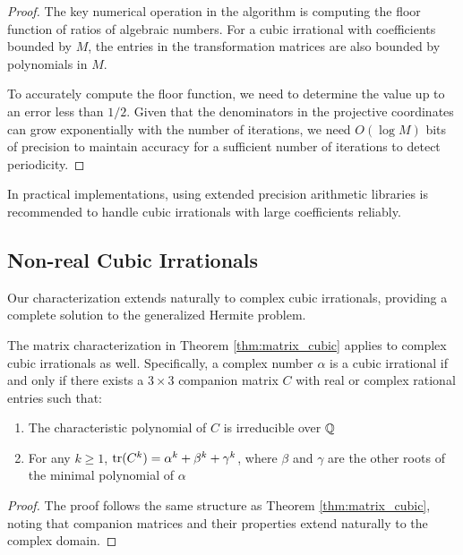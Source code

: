 \begin{proof}
The key numerical operation in the \HAPD{} algorithm is computing the floor function of ratios of algebraic numbers. For a cubic irrational with coefficients bounded by $M$, the entries in the transformation matrices are also bounded by polynomials in $M$. 

To accurately compute the floor function, we need to determine the value up to an error less than $1/2$. Given that the denominators in the projective coordinates can grow exponentially with the number of iterations, we need $O(\log M)$ bits of precision to maintain accuracy for a sufficient number of iterations to detect periodicity.
\end{proof}

\begin{remark}
In practical implementations, using extended precision arithmetic libraries is recommended to handle cubic irrationals with large coefficients reliably.
\end{remark}

\subsection{Non-real Cubic Irrationals}

Our characterization extends naturally to complex cubic irrationals, providing a complete solution to the generalized Hermite problem.

\begin{theorem}\label{thm:complex_cubic}
The matrix characterization in Theorem \ref{thm:matrix_cubic} applies to complex cubic irrationals as well. Specifically, a complex number $\alpha$ is a cubic irrational if and only if there exists a $3 \times 3$ companion matrix $C$ with real or complex rational entries such that:
\begin{enumerate}
    \item The characteristic polynomial of $C$ is irreducible over $\mathbb{Q}$
    \item For any $k \geq 1$, $\operatorname{tr}(C^k) = \alpha^k + \beta^k + \gamma^k$, where $\beta$ and $\gamma$ are the other roots of the minimal polynomial of $\alpha$
\end{enumerate}
\end{theorem}

\begin{proof}
The proof follows the same structure as Theorem \ref{thm:matrix_cubic}, noting that companion matrices and their properties extend naturally to the complex domain.
\end{proof}


